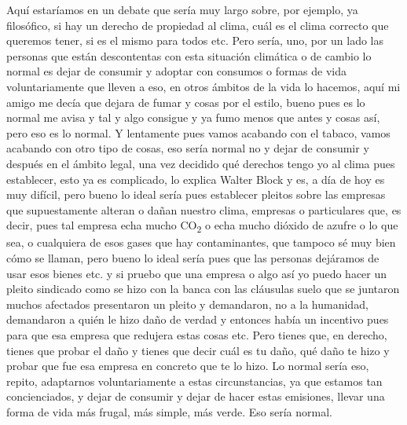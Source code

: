 Aquí estaríamos en un debate que sería muy largo sobre, por ejemplo, ya filosófico, si hay un derecho de propiedad al clima, cuál es el clima correcto que queremos tener, si es el mismo para todos etc. Pero sería, uno, por un lado las personas que están descontentas con esta situación climática o de cambio lo normal es dejar de consumir y adoptar con consumos o formas de vida voluntariamente que lleven a eso, en otros ámbitos de la vida lo hacemos, aquí mi amigo me decía que dejara de fumar y cosas por el estilo, bueno pues es lo normal me avisa y tal y algo consigue y ya fumo menos que antes y cosas así, pero eso es lo normal. Y lentamente pues vamos acabando con el tabaco, vamos acabando con otro tipo de cosas, eso sería normal no y dejar de consumir y después en el ámbito legal, una vez decidido qué derechos tengo yo al clima pues establecer, esto ya es complicado, lo explica Walter Block y es, a día de hoy es muy difícil, pero bueno lo ideal sería pues establecer pleitos sobre las empresas que supuestamente alteran o dañan nuestro clima, empresas o particulares que, es decir, pues tal empresa echa mucho CO\textsubscript{2} o echa mucho dióxido de azufre o lo que sea, o cualquiera de esos gases que hay contaminantes, que tampoco sé muy bien cómo se llaman, pero bueno lo ideal sería pues que las personas dejáramos de usar esos bienes etc. y si pruebo que una empresa o algo así yo puedo hacer un pleito sindicado como se hizo con la banca con las cláusulas suelo que se juntaron muchos afectados presentaron un pleito y demandaron, no a la humanidad, demandaron a quién le hizo daño de verdad y entonces había un incentivo pues para que esa empresa que redujera estas cosas etc. Pero tienes que, en derecho, tienes que probar el daño y tienes que decir cuál es tu daño, qué daño te hizo y probar que fue esa empresa en concreto que te lo hizo. Lo normal sería eso, repito, adaptarnos voluntariamente a estas circunstancias, ya que estamos tan concienciados, y dejar de consumir y dejar de hacer estas emisiones, llevar una forma de vida más frugal, más simple, más verde. Eso sería normal.

